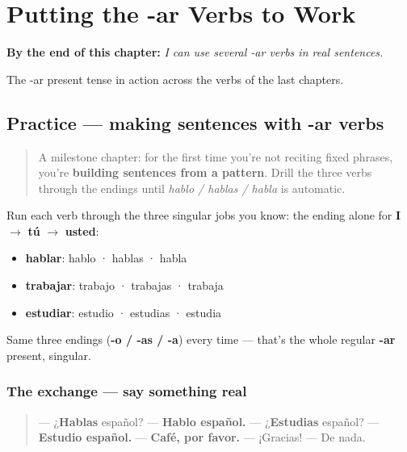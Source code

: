 
\chapter{Putting the -ar Verbs to Work}
\label{ch:spanish-ar-practice}

\begin{chapteropening}
\textbf{By the end of this chapter:} \emph{I can use several -ar verbs in real sentences.}

The -ar present tense in action across the verbs of the last chapters.
\end{chapteropening}

\section[Practice]{Practice — making sentences with -ar verbs}

\label{lesson:ES-C06-practice}



\begin{quote}
A milestone chapter: for the first time you're not reciting fixed phrases, you're \textbf{building sentences from a pattern}. Drill the three verbs through the endings until \emph{hablo / hablas / habla} is automatic.
\end{quote}

\begin{grammarlens}[title={Grammar Lens: conjugate on command}]
Run each verb through the three singular jobs you know: the ending alone for \textbf{I} $\to$ \textbf{tú} $\to$ \textbf{usted}:

\begin{itemize}
\raggedright
  \item \textbf{hablar}: hablo · hablas · habla
  \item \textbf{trabajar}: trabajo · trabajas · trabaja
  \item \textbf{estudiar}: estudio · estudias · estudia
\end{itemize}

Same three endings (\textbf{-o / -as / -a}) every time — that's the whole regular \textbf{-ar} present, singular.
\end{grammarlens}

\subsection*{The exchange — say something real}
\begin{quote}
— ¿\textbf{Hablas} español? — \textbf{Hablo español.} — ¿\textbf{Estudias} español? — \textbf{Estudio español.} — \textbf{Café, por favor.} — ¡Gracias! — De nada.
\end{quote}

